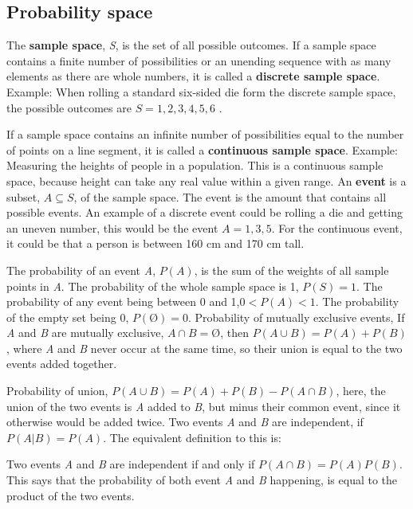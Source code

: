 \subsection{Probability space}

The \textbf{sample space}, \textit{S}, is the set of all possible outcomes.
\newline
If a sample space contains a finite number of possibilities or an unending sequence with as many elements as there are whole numbers, it is called a \textbf{discrete sample space}.
\newline
Example: When rolling a standard six-sided die form the discrete sample space, the possible outcomes are $S={1,2,3,4,5,6}$ .
\newline

If a sample space contains an infinite number of possibilities equal to the number of points on a line segment, it is called a \textbf{continuous sample space}.
\break
Example: Measuring the heights of people in a population. This is a continuous sample space, because height can take any real value within a given range. 
\newline
An \textbf{event} is a subset, $A\subseteq S$, of the sample space. The event is the amount that contains all possible events.
An example of a discrete event could be rolling a die and getting an uneven number, this would be the event $A={1,3,5}$.
\newline 
For the continuous event, it could be that a person is between 160 cm and 170 cm tall.
\newline

The probability of an event \textit{A}, $P(A)$, is the sum of the weights of all sample points in \textit{A}.
The probability of the whole sample space is 1, $P(S)=1$.
The probability of any event being between 0 and 1,$0<P(A)<1$.
The probability of the empty set being 0, $P(Ø)=0$.
\newline
\newline
Probability of mutually exclusive events,
\newline
If \textit{A} and \textit{B} are mutually exclusive, $A \cap B=Ø$, then
\newline
$P(A \cup B) = P(A)+P(B)$,
\newline
\newline
where \textit{A} and \textit{B} never occur at the same time, so their union is equal to the two events added together. 
\newline

Probability of union,
\newline
$P(A \cup B)=P(A)+P(B)-P(A \cap B)$,
\newline
here, the union of the two events is \textit{A} added to \textit{B}, but minus their common event, since it otherwise would be added twice. 
\newline
Two events \textit{A} and \textit{B} are independent, if 
\newline
$P(A|B)=P(A)$.
\newline
The equivalent definition to this is:
\newline

Two events \textit{A} and \textit{B} are independent if and only if
\newline
$P(A \cap B)=P(A)P(B)$.
This says that the probability of both event \textit{A} and \textit{B} happening, is equal to the product of the two events.
